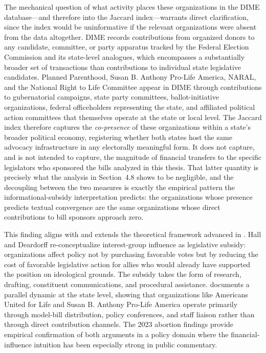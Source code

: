 The mechanical question of what activity places these organizations in the DIME database---and therefore into the Jaccard index---warrants direct clarification, since the index would be uninformative if the relevant organizations were absent from the data altogether. DIME records contributions from organized donors to any candidate, committee, or party apparatus tracked by the Federal Election Commission and its state-level analogues, which encompasses a substantially broader set of transactions than contributions to individual state legislative candidates. Planned Parenthood, Susan B. Anthony Pro-Life America, NARAL, and the National Right to Life Committee appear in DIME through contributions to gubernatorial campaigns, state party committees, ballot-initiative organizations, federal officeholders representing the state, and affiliated political action committees that themselves operate at the state or local level. The Jaccard index therefore captures the \textit{co-presence} of these organizations within a state's broader political economy, registering whether both states host the same advocacy infrastructure in any electorally meaningful form. It does not capture, and is not intended to capture, the magnitude of financial transfers to the specific legislators who sponsored the bills analyzed in this thesis. That latter quantity is precisely what the analysis in Section~4.8 shows to be negligible, and the decoupling between the two measures is exactly the empirical pattern the informational-subsidy interpretation predicts: the organizations whose presence predicts textual convergence are the same organizations whose direct contributions to bill sponsors approach zero.

This finding aligns with and extends the theoretical framework advanced in \textcite{hallLobbyingLegislativeSubsidy2006a}. Hall and Deardorff re-conceptualize interest-group influence as legislative subsidy: organizations affect policy not by purchasing favorable votes but by reducing the cost of favorable legislative action for allies who would already have supported the position on ideological grounds. The subsidy takes the form of research, drafting, constituent communications, and procedural assistance. \textcite{hertel-fernandezStateCapture2019} documents a parallel dynamic at the state level, showing that organizations like Americans United for Life and Susan B. Anthony Pro-Life America operate primarily through model-bill distribution, policy conferences, and staff liaison rather than through direct contribution channels. The 2023 abortion findings provide empirical confirmation of both arguments in a policy domain where the financial-influence intuition has been especially strong in public commentary.

